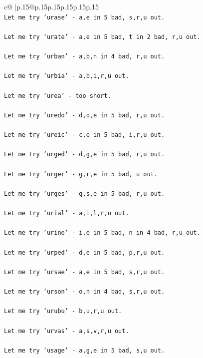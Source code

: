 \documentclass{article}
\begin{document}
{\begin{supertabular}{c@{$\;$}|p{.15\linewidth}@{}p{.15\linewidth}p{.15\linewidth}p{.15\linewidth}p{.15\linewidth}p{.15\linewidth}}
{{{\\ 
\texttt{Let me try 'urase' {-} a,e in 5 bad, s,r,u out. } \\
\\ 
\texttt{Let me try 'urate' {-} a,e in 5 bad, t in 2 bad, r,u out. } \\
\\ 
\texttt{Let me try 'urban' {-} a,b,n in 4 bad, r,u out. } \\
\\ 
\texttt{Let me try 'urbia' {-} a,b,i,r,u out. } \\
\\ 
\texttt{Let me try 'urea' {-} too short. } \\
\\ 
\texttt{Let me try 'uredo' {-} d,o,e in 5 bad, r,u out. } \\
\\ 
\texttt{Let me try 'ureic' {-} c,e in 5 bad, i,r,u out. } \\
\\ 
\texttt{Let me try 'urged' {-} d,g,e in 5 bad, r,u out. } \\
\\ 
\texttt{Let me try 'urger' {-} g,r,e in 5 bad, u out. } \\
\\ 
\texttt{Let me try 'urges' {-} g,s,e in 5 bad, r,u out. } \\
\\ 
\texttt{Let me try 'urial' {-} a,i,l,r,u out. } \\
\\ 
\texttt{Let me try 'urine' {-} i,e in 5 bad, n in 4 bad, r,u out. } \\
\\ 
\texttt{Let me try 'urped' {-} d,e in 5 bad, p,r,u out. } \\
\\ 
\texttt{Let me try 'ursae' {-} a,e in 5 bad, s,r,u out. } \\
\\ 
\texttt{Let me try 'urson' {-} o,n in 4 bad, s,r,u out. } \\
\\ 
\texttt{Let me try 'urubu' {-} b,u,r,u out. } \\
\\ 
\texttt{Let me try 'urvas' {-} a,s,v,r,u out. } \\
\\ 
\texttt{Let me try 'usage' {-} a,g,e in 5 bad, s,u out. } \\
\\ 
}}}
\end{supertabular}}
\end{document}
